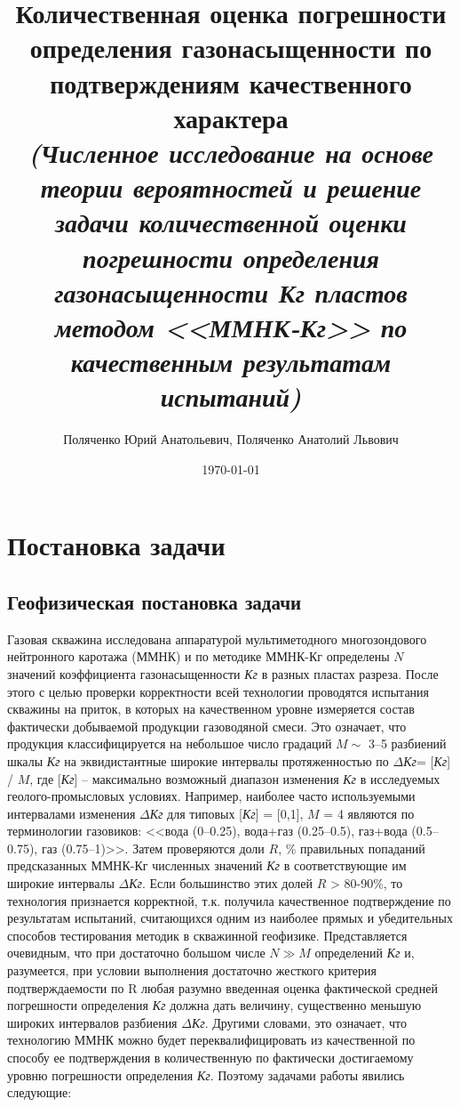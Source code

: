 \documentclass[a4paper,12pt]{article} %
\author{Поляченко Юрий Анатольевич, Поляченко Анатолий Львович}
\title{Количественная оценка погрешности определения газонасыщенности по подтверждениям качественного характера \\ \emph{\small (Численное исследование на основе теории вероятностей и решение задачи количественной оценки погрешности определения газонасыщенности Кг пластов методом <<ММНК-Кг>> по качественным результатам испытаний)}}
\date{\today}
\begin{document}

\clearpage\maketitle
\thispagestyle{empty}

\newpage

\tableofcontents

\newpage

\section{Постановка задачи}

\subsection{Геофизическая постановка задачи}

Газовая скважина исследована аппаратурой мультиметодного многозондового нейтронного каротажа (ММНК) и по методике ММНК-Кг определены $N$ значений коэффициента газонасыщенности \emph{Кг} в разных пластах разреза. После этого  с целью проверки корректности всей технологии проводятся испытания скважины на приток, в которых на качественном уровне измеряется состав фактически добываемой продукции газоводяной смеси. Это означает, что продукция классифицируется на небольшое число градаций $M \sim$ 3--5 разбиений шкалы \emph{Кг} на эквидистантные широкие интервалы протяженностью по $\Delta$\emph{Кг}= [\emph{Кг}] / $M$, где [\emph{Кг}] – максимально возможный диапазон изменения \emph{Кг} в исследуемых геолого-промысловых условиях. Например, наиболее часто используемыми интервалами изменения $\Delta$\emph{Кг} для типовых [\emph{Кг}] = [0,1], $M$ = 4 являются по терминологии газовиков:  <<вода (0--0.25), вода+газ (0.25--0.5), газ+вода (0.5--0.75), газ (0.75--1)>>. Затем проверяются доли $R$, \% правильных попаданий предсказанных ММНК-Кг численных значений \emph{Кг} в соответствующие им широкие интервалы $\Delta$\emph{Кг}. Если большинство этих долей $R$ > 80-90\%, то технология признается корректной, т.к. получила качественное подтверждение по результатам испытаний, считающихся одним из наиболее прямых и убедительных способов тестирования методик в скважинной геофизике.
Представляется очевидным, что при достаточно большом числе $N \gg M$ определений \emph{Кг} и, разумеется, при условии выполнения достаточно жесткого критерия подтверждаемости по R любая разумно введенная оценка фактической средней погрешности определения \emph{Кг}   должна дать величину, существенно меньшую широких интервалов разбиения $\Delta$\emph{Кг}. Другими словами, это означает, что технологию ММНК можно будет переквалифицировать из качественной по способу ее подтверждения в количественную по фактически достигаемому уровню погрешности определения \emph{Кг}. 
Поэтому задачами работы явились следующие:
\end{document}
